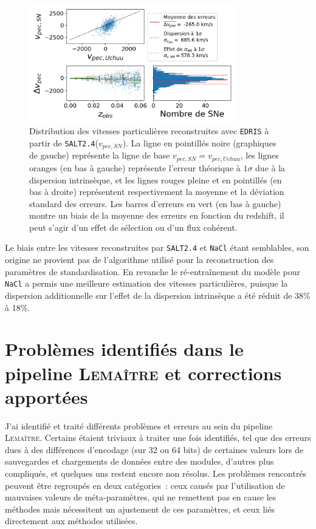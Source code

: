 \documentclass{book}
\def\lemaitre{\textsc{Lemaître}\xspace}
\def\nacl{\texttt{NaCl}\xspace}
\def\edris{\texttt{EDRIS}\xspace}
\def\saltd{\texttt{SALT2.4}\xspace}
\begin{document}
\begin{figure}[h]
	\centering
	\includegraphics[width=0.8\textwidth]{figures/vp_nacl.png}
	\caption{Distribution des vitesses particulières reconstruites avec \edris à partir de \saltd ($v_{pec,SN}$). La ligne en pointillés noire (graphiques de gauche) représente la ligne de base $v_{pec, SN} = v_{pec, Uchuu}$, les lignes oranges (en bas à gauche) représente l'erreur théorique à $1\sigma$ due à la dispersion intrinsèque, et les lignes rouges pleine et en pointillés (en bas à droite) représentent respectivement la moyenne et la déviation standard des erreurs. Les barres d'erreurs en vert (en bas à gauche) montre un biais de la moyenne des erreurs en fonction du redshift, il peut s'agir d'un effet de sélection ou d'un flux cohérent.}
	\label{fig:vp_nacl}
\end{figure}

Le biais entre les vitesses reconstruites par \saltd et \nacl étant semblables, son origine ne provient pas de l'algorithme utilisé pour la reconstruction des paramètres de standardisation. En revanche le ré-entraînement du modèle pour \nacl a permis une meilleure estimation des vitesses particulières, puisque la dispersion additionnelle sur l'effet de la dispersion intrinsèque a été réduit de 38\% à 18\%.


\section{Problèmes identifiés dans le pipeline \lemaitre et corrections apportées}

J'ai identifié et traité différents problèmes et erreurs au sein du pipeline \lemaitre. Certains étaient triviaux à traiter une fois identifiés, tel que des erreurs dues à des différences d'encodage (sur 32 ou 64 bits) de certaines valeurs lors de sauvegardes et chargements de données entre des modules, d'autres plus compliqués, et quelques uns restent encore non résolus. Les problèmes rencontrés peuvent être regroupés en deux catégories~: ceux causés par l'utilisation de mauvaises valeurs de méta-paramètres, qui ne remettent pas en cause les méthodes mais nécessitent un ajustement de ces paramètres, et ceux liés directement aux méthodes utilisées.
\end{document}
